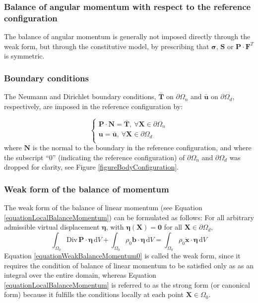 \documentclass[oneside,11pt,times]{book}
\begin{document}
\subsubsection{Balance of angular momentum with respect to the reference configuration}

The balance of angular momentum is generally not imposed directly through the weak form, but through the constitutive model, by prescribing that $\bm{\sigma}$, $\bm{S}$ or $\bm{P}\cdot \bm{F}^{T}$ is symmetric.


\subsubsection{Boundary conditions}

The Neumann and Dirichlet boundary conditions, $\bar{\bm{T}}$ on $\partial \Omega_n$ and $\bar{\bm{u}}$ on $\partial \Omega_d$, respectively, are imposed in the reference configuration by:

\begin{equation}
\begin{cases}
\bm{P}\cdot\bm{N}=\bar{\bm{T}}, \: \forall \bm{X} \in \partial \Omega_n\\
\bm{u}=\bar{\bm{u}}, \: \forall \bm{X} \in \partial \Omega_d\\
\end{cases}
\label{boundaryconditions}
\end{equation}
where $\bm{N}$ is the normal to the boundary in the reference configuration, and where the subscript ``$0$'' (indicating the reference configuration) of $\partial \Omega_n$ and $\partial \Omega_d$ was dropped for clarity, see Figure \ref{figureBodyConfiguration}.

\subsubsection{Weak form of the balance of momentum}
 \label{subsectionWeakFormMomentum}

The weak form of the balance of linear momentum (see Equation \eqref{equationLocalBalanceMomentum}) can be formulated as follows: For all arbitrary admissible virtual displacement $\bm{\eta}$, with $\bm{\eta}(\bm{X}) = \bm{0}$ for all  $\bm{X} \in \partial \Omega_{d}$,
%
\begin{equation} \label{equationWeakBalanceMomentum0}
 \int_{\Omega_0} \text{Div} \, \bm{P} \cdot \bm{\eta} \, \text{d} V + \int_{\Omega_0} \rho_0 \bm{b} \cdot \bm{\eta}  \, \text{d} V = \int_{\Omega_0} \rho_0 \ddot{\bm{x}} \cdot \bm{\eta}  \, \text{d} V
\end{equation}
%
Equation \eqref{equationWeakBalanceMomentum0} is called the weak form, since it requires the condition of balance of linear momentum to be satisfied only as as an integral over the entire domain, whereas Equation \eqref{equationLocalBalanceMomentum} is referred to as the strong form (or canonical form) because it fulfills the conditions locally at each point $\bm{X} \in \Omega_0$.
\end{document}
